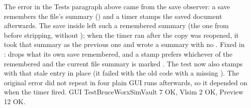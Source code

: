 The error in the Tests paragraph above came from the save observer: a  save remembers the file's summary
() and a timer stamps the saved document afterwards. The save inside 
left such a remembered summary (the one from before stripping, without ); when the timer ran
after the copy was reopened, it took that summary as the previous one and wrote a summary with no .
Fixed in :  drops what its own save remembered, and a stamp prefers
whichever of the remembered and the current file summary is marked . The test now also
stamps with that stale entry in place (it failed with the old code with a missing ). The
original error did not repeat in four plain GUI runs afterwards, so it depended on when the timer fired.
GUI TestBruceWorxSimVault 7 OK, Vlsim 2 OK, Preview 12 OK.
